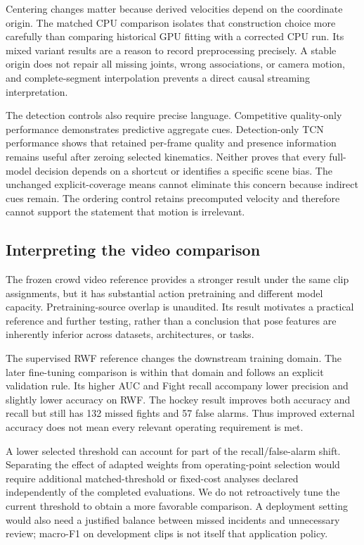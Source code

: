 \documentclass[journal]{IEEEtai}
\begin{document}
Centering changes matter because derived velocities depend on the coordinate origin. The matched CPU comparison isolates that construction choice more carefully than comparing historical GPU fitting with a corrected CPU run. Its mixed variant results are a reason to record preprocessing precisely. A stable origin does not repair all missing joints, wrong associations, or camera motion, and complete-segment interpolation prevents a direct causal streaming interpretation.

The detection controls also require precise language. Competitive quality-only performance demonstrates predictive aggregate cues. Detection-only TCN performance shows that retained per-frame quality and presence information remains useful after zeroing selected kinematics. Neither proves that every full-model decision depends on a shortcut or identifies a specific scene bias. The unchanged explicit-coverage means cannot eliminate this concern because indirect cues remain. The ordering control retains precomputed velocity and therefore cannot support the statement that motion is irrelevant.

\subsection{Interpreting the video comparison}
The frozen crowd video reference provides a stronger result under the same clip assignments, but it has substantial action pretraining and different model capacity. Pretraining-source overlap is unaudited. Its result motivates a practical reference and further testing, rather than a conclusion that pose features are inherently inferior across datasets, architectures, or tasks.

The supervised RWF reference changes the downstream training domain. The later fine-tuning comparison is within that domain and follows an explicit validation rule. Its higher AUC and Fight recall accompany lower precision and slightly lower accuracy on RWF. The hockey result improves both accuracy and recall but still has 132 missed fights and 57 false alarms. Thus improved external accuracy does not mean every relevant operating requirement is met.

A lower selected threshold can account for part of the recall/false-alarm shift. Separating the effect of adapted weights from operating-point selection would require additional matched-threshold or fixed-cost analyses declared independently of the completed evaluations. We do not retroactively tune the current threshold to obtain a more favorable comparison. A deployment setting would also need a justified balance between missed incidents and unnecessary review; macro-F1 on development clips is not itself that application policy.
\end{document}
